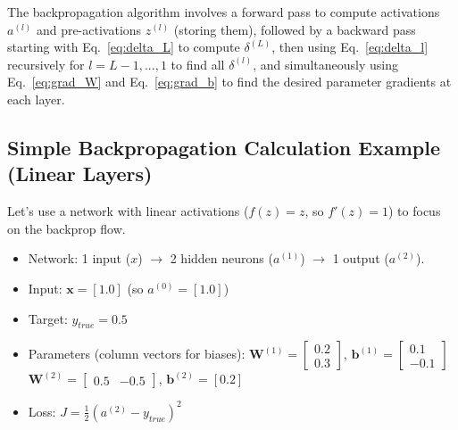 \documentclass{article}
\newcommand{\bW}{\bm{W}}
\newcommand{\bb}{\bm{b}}
\newcommand{\bx}{\bm{x}}
\begin{document}
The backpropagation algorithm involves a forward pass to compute activations $a^{(l)}$ and pre-activations $z^{(l)}$ (storing them), followed by a backward pass starting with Eq.~\ref{eq:delta_L} to compute $\delta^{(L)}$, then using Eq.~\ref{eq:delta_l} recursively for $l=L-1, ..., 1$ to find all $\delta^{(l)}$, and simultaneously using Eq.~\ref{eq:grad_W} and Eq.~\ref{eq:grad_b} to find the desired parameter gradients at each layer.

\subsection{Simple Backpropagation Calculation Example (Linear Layers)}
Let's use a network with linear activations ($f(z)=z$, so $f'(z)=1$) to focus on the backprop flow.
\begin{itemize}
    \item Network: 1 input ($x$) $\to$ 2 hidden neurons ($a^{(1)}$) $\to$ 1 output ($a^{(2)}$).
    \item Input: $\bx = [1.0]$ (so $a^{(0)} = [1.0]$)
    \item Target: $y_{true} = 0.5$
    \item Parameters (column vectors for biases):
        $\bW^{(1)} = \begin{bmatrix} 0.2 \\ 0.3 \end{bmatrix}$, $\bb^{(1)} = \begin{bmatrix} 0.1 \\ -0.1 \end{bmatrix}$
        $\bW^{(2)} = \begin{bmatrix} 0.5 & -0.5 \end{bmatrix}$, $\bb^{(2)} = [0.2]$
    \item Loss: $J = \frac{1}{2} (a^{(2)} - y_{true})^2$
\end{itemize}
\end{document}
